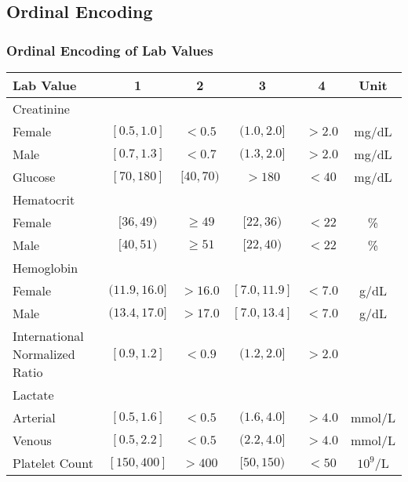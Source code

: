 \subsection{Ordinal Encoding}\label{sec:supp_ordinal}

\subsubsection{Ordinal Encoding of Lab Values} \label{sec:supp_labs}
\begin{table}[ht]
\setlength{\tabcolsep}{0.5em}
\begin{tabularx}{\linewidth}{L c c c c c}
\hline
Lab Value & 1 & 2 & 3 & 4 & Unit\\
\hline
Creatinine & & & & & \\
\hspace{3mm}Female & $[0.5, 1.0]$ & $< 0.5$ & $(1.0, 2.0]$ & $> 2.0$ & mg/dL\\
\hspace{3mm}Male & $[0.7, 1.3]$ & $< 0.7$ & $(1.3, 2.0]$ & $ > 2.0$ & mg/dL\\
\hline
Glucose & $[70, 180]$ & $[40, 70)$ & $> 180$ & $< 40$ & mg/dL\\
\hline
Hematocrit & & & & & \\
\hspace{3mm}Female & $[36,49)$ & $\geq 49$ & $[22, 36)$ & $< 22$ & \%\\
\hspace{3mm}Male & $[40, 51) $ & $\geq 51$ & $[22, 40)$ & $< 22$ & \%\\
\hline
Hemoglobin & & & & & \\
\hspace{3mm}Female & $(11.9, 16.0]$ & $> 16.0$ & $[7.0, 11.9]$ & $< 7.0$ & g/dL\\
\hspace{3mm}Male & $(13.4, 17.0]$ & $>17.0$ & $[7.0, 13.4]$ & $< 7.0$ & g/dL\\
\hline
International Normalized Ratio & $[0.9, 1.2]$ & $< 0.9$ & $(1.2, 2.0]$ & $ >2.0$ &\\
\hline
Lactate & & & & &\\
\hspace{3mm}Arterial & $[0.5, 1.6]$ & $< 0.5$ & $(1.6, 4.0]$ & $> 4.0$ & mmol/L\\
\hspace{3mm}Venous & $[0.5, 2.2]$ & $< 0.5$ & $(2.2, 4.0]$ & $> 4.0$ & mmol/L\\
\hline
Platelet Count & $[150, 400]$ & $> 400$ & $[50, 150)$ & $< 50$ & $10^9$/L\\

\end{tabularx}
\end{table}

